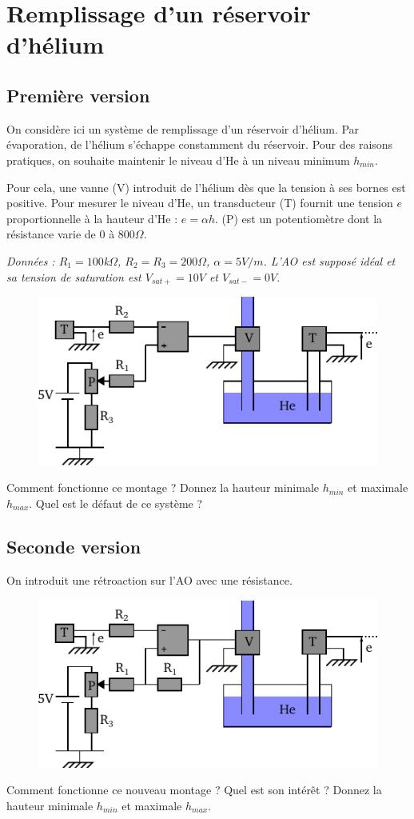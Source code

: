 \documentclass{report}
\begin{document}
\newpage

\section*{Remplissage d'un réservoir d'hélium}
\subsection*{Première version}
On considère ici un système de remplissage d'un réservoir d'hélium. Par évaporation, de l'hélium s'échappe constamment du réservoir. Pour des raisons pratiques, on souhaite maintenir le niveau d'He à un niveau minimum $h_{min}$.

Pour cela, une vanne (V) introduit de l'hélium dès que la tension à ses bornes est positive. Pour mesurer le niveau d'He, un transducteur (T) fournit une tension $e$ proportionnelle à la hauteur d'He : $e= \alpha h$. (P) est un potentiomètre dont la résistance varie de $0$ à $800\Omega$.

\textit{Données : $R_{1} = 100$k$\Omega$, $R_{2}=R_{3}=200\Omega$, $\alpha = 5V/m$. L'AO est supposé idéal et sa tension de saturation est $V_{sat+}=10V$ et $V_{sat-}=0V.$}

\begin{figure}[!h]
\centering
\includegraphics[width=0.8\linewidth]{circuit_10.pdf}
\end{figure}

Comment fonctionne ce montage ? Donnez la hauteur minimale $h_{min}$ et maximale $h_{max}$. Quel est le défaut de ce système ?

\subsection*{Seconde version}
On introduit une rétroaction sur l'AO avec une résistance.

\begin{figure}[!h]
\centering
\includegraphics[width=0.8\linewidth]{circuit_11.pdf}
\end{figure}

Comment fonctionne ce nouveau montage ? Quel est son intérêt ? Donnez la hauteur minimale $h_{min}$ et maximale $h_{max}$.
\end{document}
